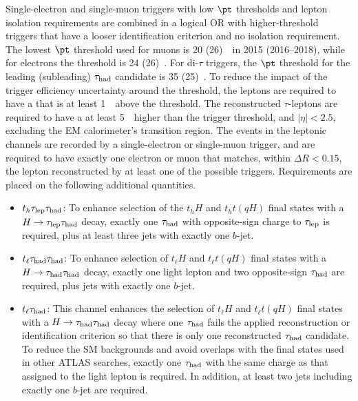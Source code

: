 Single-electron and single-muon triggers with low $\pt$ thresholds and lepton isolation requirements are combined in a logical OR 
with higher-threshold triggers that have a looser identification criterion and no isolation requirement.
The lowest $\pt$ threshold used for muons is 20 (26)~\gev\ in 2015 (2016--2018), while for electrons the threshold is 24 (26)~\gev.
For di-$\tau$ triggers, the $\pt$ threshold for the leading (subleading) $\tau_{\mathrm{had}}$ candidate is 35 (25)~\gev.
To reduce the impact of the trigger efficiency uncertainty around the threshold, the leptons are required to have a \pt that is at least 1~\GeV\ above the threshold. 
The reconstructed $\tau$-leptons are required to have a \pt at least 5~\GeV\ higher than the trigger threshold, and $|\eta|<2.5$, excluding the EM calorimeter's transition region.
The events in the leptonic channels are recorded by a single-electron or single-muon trigger, and are required to have exactly one electron or muon that matches, within $\Delta R < 0.15$, the lepton reconstructed by at least one of the possible triggers. Requirements are placed on the following additional quantities.
\begin{itemize}
\item $t_h\tau_{\mathrm{lep}} \tau_{\mathrm{had}}$: To enhance selection of the $t_hH$ and $t_ht(qH)$ final states with a $H\to\tau_{\mathrm{lep}} \tau_{\mathrm{had}}$ decay, exactly one $\tau_{\mathrm{had}}$ with opposite-sign charge to $\tau_{\mathrm{lep}}$ is required, plus at least three jets with exactly one $b$-jet.
\item $t_{\ell}\tau_{\mathrm{had}} \tau_{\mathrm{had}}$: To enhance selection of $t_{\ell}H$ and $t_{\ell}t(qH)$ final states with a $H\to\tau_{\mathrm{had}} \tau_{\mathrm{had}}$ decay, exactly one light lepton and two opposite-sign $\tau_{\mathrm{had}}$ are required,
  plus jets with exactly one $b$-jet.
\item $t_{\ell}\tau_{\mathrm{had}}$: This channel enhances the selection of $t_{\ell}H$ and $t_{\ell}t(qH)$ final states with a $H\to\tau_{\mathrm{had}} \tau_{\mathrm{had}}$ decay where one $\tau_{\mathrm{had}}$ fails the applied reconstruction or identification
  criterion so that there is only one reconstructed $\tau_{\mathrm{had}}$ candidate.
  To reduce the SM backgrounds and avoid overlaps with the final states used in other ATLAS searches, exactly one $\tau_{\mathrm{had}}$ with the same charge as that assigned to the light lepton is required.
  In addition, at least two jets including exactly one $b$-jet are required.
\end{itemize}

